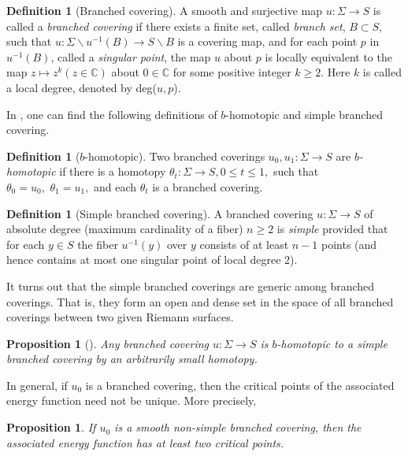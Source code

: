 \documentclass[11pt]{amsart}
\numberwithin{equation}{section}
\def\mb{\mathbb}
\theoremstyle{plain}
\newtheorem{prop}[thm]{Proposition}
\theoremstyle{definition}
\theoremstyle{definition}
\newtheorem{defn}[thm]{Definition}
\begin{document}
\begin{defn}[Branched covering]
A smooth and surjective map $u: \Sigma \to S$ is called a {\it branched covering} if there exists a finite set, called {\it branch set},  $B\subset S$, such that $u: \Sigma \backslash u^{-1}(B) \to S\backslash B$ is a covering map, and for each point $p$ in $u^{-1}(B)$, called a {\it singular point}, the map $u$ about $p$ is locally equivalent to the map $z\mapsto z^k (z\in\mb{C})$ about $0\in\mb{C}$ for some positive integer $k\geq 2$. Here $k$ is called a local degree, denoted by
deg($u, p$).
\end{defn}
In \cite{BE}, one can find the following definitions of $b$-homotopic and simple branched covering.  
\begin{defn}[$b$-homotopic]
	Two branched coverings \(u_{0}, u_{1}: \Sigma \rightarrow S\) 
are {\it \(b\)-homotopic} if there is a homotopy \(\theta_{t}: \Sigma \rightarrow S, 0 \leqslant t \leqslant 1,\) such that
\(\theta_{0}=u_{0}, \,\,\theta_{1}=u_{1},\) and each \(\theta_{t}\) is a branched covering.
\end{defn}
\begin{defn}[Simple branched covering]\label{sbc}
	A branched covering \(u: \Sigma \rightarrow S\) of absolute degree (maximum cardinality of a fiber) \(n \geqslant 2\) is {\it simple} provided that for each \(y \in S\) the fiber
\(u^{-1}(y)\) over \(y\) consists of at least \(n-1\) points (and hence contains at most
one singular point  of local degree $2$).
\end{defn}
It turns out that the simple branched coverings are generic among branched coverings. That is, they form an open and dense set in the space of all branched coverings between two given Riemann surfaces. 
\begin{prop}[{\cite[Proposition 3]{BE}}]\label{prop-b}
Any branched covering \(u: \Sigma \rightarrow S\) is $b$-homotopic to a
simple branched covering by an arbitrarily small homotopy.	
\end{prop}
In general, if $u_0$ is a branched covering, then the critical points of the associated energy function need not be unique. More precisely,
\begin{prop}
If $u_0$ is a smooth non-simple branched covering, then the associated energy function has at least two critical points. 
\end{prop}
\end{document}

